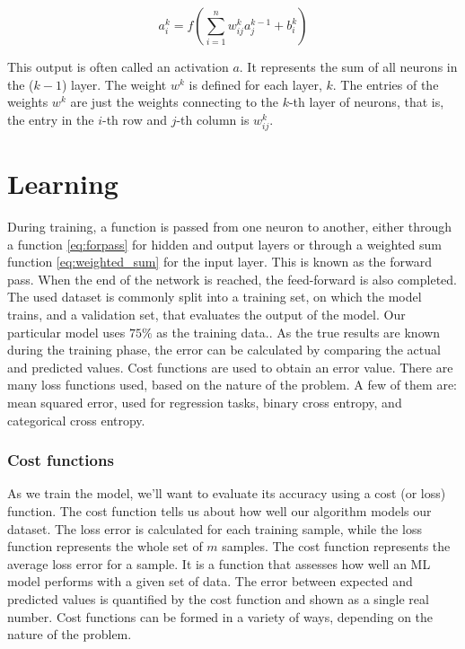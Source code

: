 \begin{equation}
	a_i^k =f\left(\sum_{i=1}^{n} w_{ij}^k a_j^{k-1} + b_i^k\right)
	\label{eq:forpasshidden}
\end{equation}

This output is often called an activation $a$. It represents the sum of all neurons in the ($k-1$) layer. The weight $w^k$ is defined for each layer, $k$. The entries of the weights $w^k$ are just the weights connecting to the $k$-th layer of neurons, that is, the entry in the $i$-th row and $j$-th column is $w^k_{ij}$.


\section{Learning}

During training, a function is passed from one neuron to another, either through a function \ref{eq:forpass} for hidden and output layers or through a weighted sum function \ref{eq:weighted_sum} for the input layer. This is known as the forward pass. When the end of the network is reached, the feed-forward is also completed.\newline
The used dataset is commonly split into a training set, on which the model trains, and a validation set, that evaluates the output of the model. Our particular model uses $75\%$ as the training data.. 
As the true results are known during the training phase, the error can be calculated by comparing the actual and predicted values. Cost functions are used to obtain an error value.\newline
There are many loss functions used, based on the nature of the problem. A few of them are: mean squared error, used for regression tasks, binary cross entropy, and categorical cross entropy.
\subsubsection*{Cost functions}
As we train the model, we’ll want to evaluate its accuracy using a cost (or loss) function. The cost function tells us about how well our algorithm models our dataset. The loss error is calculated for each training sample, while the loss function represents the whole set of $m$ samples. The cost function represents the average loss error for a sample. It is a function that assesses how well an ML model performs with a given set of data. The error between expected and predicted values is quantified by the cost function and shown as a single real number. Cost functions can be formed in a variety of ways, depending on the nature of the problem.
